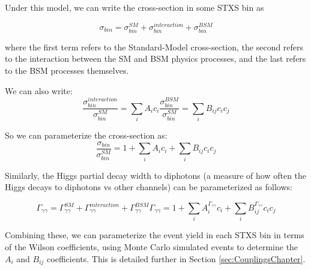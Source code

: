 Under this model, we can write the cross-section in some STXS bin as 

\begin{equation}
\sigma_{bin} =  \sigma_{bin}^{SM} + \sigma_{bin}^{interaction} + \sigma_{bin}^{BSM}
\end{equation}

where the first term refers to the Standard-Model cross-section, the second refers to the interaction between the SM and BSM physics processes, and the last refers to the BSM processes themselves.

We can also write:
\begin{equation}
\frac{\sigma_{bin}^{interaction}}{\sigma_{bin}^{SM}} = \sum_{i} A_{i} c_{i}
\frac{\sigma_{bin}^{BSM}}{\sigma_{bin}^{SM}} = \sum_{i} B_{ij} c_{i} c_{j}
\end{equation}

So we can parameterize the cross-section as:
\begin{equation}
\frac{\sigma_{bin}}{\sigma_{bin}^{SM}} = 1 + \sum_{i} A_{i} c_{i} + \sum_{i} B_{ij} c_{i} c_{j}
\end{equation}

Similarly, the Higgs partial decay width to diphotons (a measure of how often the Higgs decays to diphotons vs other channels) can be parameterized as follows:

\begin{equation}
\Gamma_{\gamma \gamma} = \Gamma_{\gamma \gamma}^{SM} + \Gamma_{\gamma \gamma}^{interaction} + \Gamma_{\gamma \gamma}^{BSM}
\Gamma_{\gamma \gamma} = 1 + \sum_{i} A_{i}^{\Gamma_{\gamma \gamma}} c_{i} + \sum_{i} B_{ij}^{\Gamma_{\gamma \gamma}} c_{i} c_{j}
\end{equation}

Combining these, we can parameterize the event yield in each STXS bin in terms of the Wilson coefficients, using Monte Carlo simulated events to determine the $A_{i}$ and $B_{ij}$ coefficients. This is detailed further in Section \ref{sec:CouplingsChapter}.

